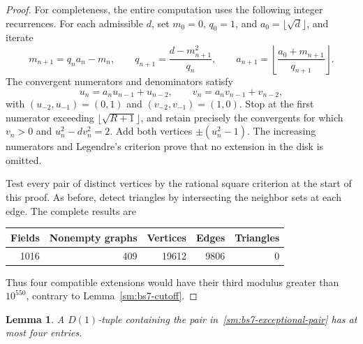 \documentclass[12pt]{article}
\newtheorem{lemma}[theorem]{Lemma}
\numberwithin{equation}{section}
\begin{document}
\begin{proof}
For completeness, the entire computation uses the following integer recurrences. For each admissible $d$, set $m_0=0$, $q_0=1$, and $a_0=\lfloor\sqrt d\rfloor$, and iterate
\begin{equation*}
 m_{n+1}=q_na_n-m_n,\qquad
 q_{n+1}=\frac{d-m_{n+1}^2}{q_n},\qquad
 a_{n+1}=\left\lfloor\frac{a_0+m_{n+1}}{q_{n+1}}\right\rfloor.
\end{equation*}
The convergent numerators and denominators satisfy
\begin{equation*}
 u_n=a_nu_{n-1}+u_{n-2},\qquad
 v_n=a_nv_{n-1}+v_{n-2},
\end{equation*}
with $(u_{-2},u_{-1})=(0,1)$ and $(v_{-2},v_{-1})=(1,0)$.
Stop at the first numerator exceeding $\lfloor\sqrt{R+1}\rfloor$, and retain precisely the convergents for which $v_n>0$ and $u_n^2-dv_n^2=2$. Add both vertices $\pm(u_n^2-1)$. The increasing numerators and Legendre's criterion prove that no extension in the disk is omitted.

Test every pair of distinct vertices by the rational square criterion at the start of this proof. As before, detect triangles by intersecting the neighbor sets at each edge. The complete results are
\begin{center}
\begin{tabular}{rrrrr}
\toprule
Fields & Nonempty graphs & Vertices & Edges & Triangles\\
\midrule
1016 &409 &19612 &9806 &0\\
\bottomrule
\end{tabular}
\end{center}
Thus four compatible extensions would have their third modulus greater than $10^{550}$, contrary to Lemma~\ref{sm:bs7-cutoff}.
\end{proof}
\begin{lemma}\label{sm:bs7-eisenstein}
A $D(1)$-tuple containing the pair in~\eqref{sm:bs7-exceptional-pair} has at most four entries.
\end{lemma}
\end{document}
